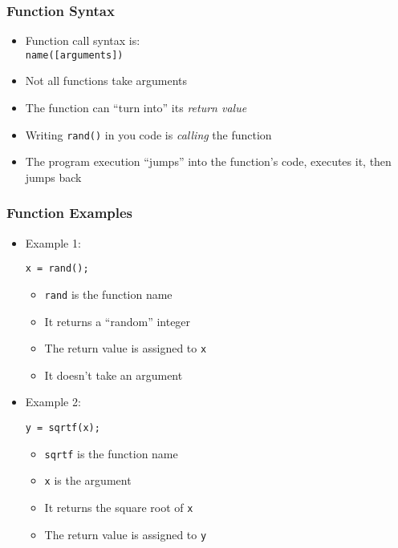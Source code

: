 \documentclass[14pt]{beamer}
\begin{document}
\begin{frame}[fragile]
\frametitle{Function Syntax}
\begin{itemize}
\item Function call syntax is:\\
{\small \texttt{name([arguments])} }
\item Not all functions take arguments
\item The function can ``turn into'' its \textit{return value}
\pause
\item Writing \texttt{rand()} in you code is \textit{calling} the function
\item The program execution ``jumps'' into the function's code, executes it, then jumps back
\end{itemize}
\end{frame}

\begin{frame}[fragile]
\frametitle{Function Examples}
\begin{itemize}
\item Example 1:
\begin{lstlisting}[style=CStyle]
x = rand();
\end{lstlisting}
	\begin{itemize}
		\item \texttt{rand} is the function name
		\item It returns a ``random'' integer
		\item The return value is assigned to \texttt{x}
		\item It doesn't take an argument 	
	\end{itemize}
\pause
\item Example 2:
\begin{lstlisting}[style=CStyle]
y = sqrtf(x);
\end{lstlisting}
	\begin{itemize}
		\item \texttt{sqrtf} is the function name
		\item \texttt{x} is the argument
		\item It returns the square root of \texttt{x}
		\item The return value is assigned to \texttt{y}
	\end{itemize}
\end{itemize}
\end{frame}
\end{document}
